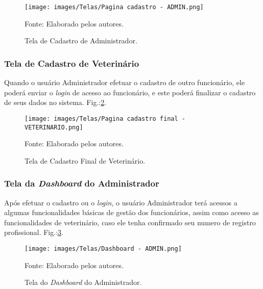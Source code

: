 \documentclass[
    12pt,               %
    openright,          %
    oneside,
    a4paper,            %
    BIBLATEX,           %
    TODO,               %
    english,            %
    brazil              %
    ]{ifsp-spo-inf-ctds}
\begin{document}
\begin{figure}[H]
                \centering
                \caption{Tela de Cadastro de Administrador.}
                \texttt{[image: images/Telas/Pagina cadastro - ADMIN.png]}

                \label{fig:CadAdmin}
                \centering
        {\footnotesize Fonte: Elaborado pelos autores.}
            \end{figure}




\subsubsection{Tela de Cadastro de Veterinário}
Quando o usuário Administrador efetuar o cadastro de outro funcionário, ele poderá enviar o \emph{login} de acesso ao funcionário, e este poderá finalizar o cadastro de seus dados no sistema. Fig.:\ref{fig:CadVet}.  

            \begin{figure}[H]
                \centering
                \caption{Tela de Cadastro Final de Veterinário.}
                \texttt{[image: images/Telas/Pagina cadastro final - VETERINARIO.png]}

                \label{fig:CadVet}
                \centering
        {\footnotesize Fonte: Elaborado pelos autores.}
            \end{figure}


\subsubsection{Tela da \emph{Dashboard} do Administrador}

Após efetuar o cadastro ou o \emph{login}, o usuário Administrador terá acessos a algumas funcionalidades básicas de gestão dos funcionários, assim como acesso as funcionalidades de veterinário, caso ele tenha confirmado seu numero de registro profissional. Fig.:\ref{fig:DashAdm}.

 \begin{figure}[H]
                \centering
                \caption{Tela do \emph{Dashboard} do Administrador.}
                \texttt{[image: images/Telas/Dashboard - ADMIN.png]}

                \label{fig:DashAdm}
                \centering
        {\footnotesize Fonte: Elaborado pelos autores.}
            \end{figure}
\end{document}
